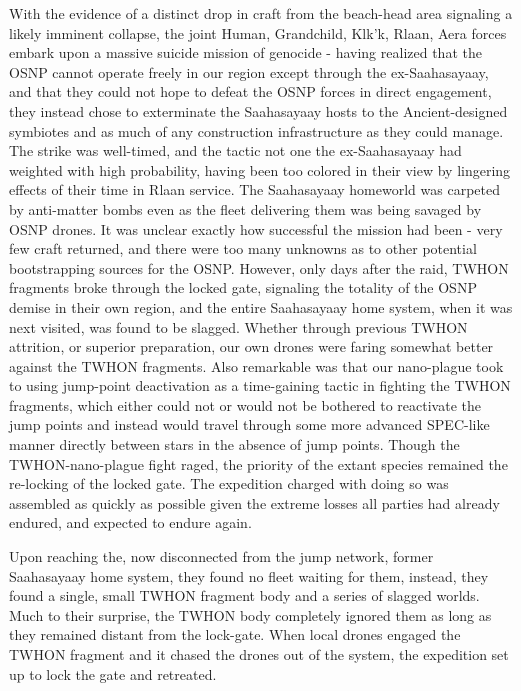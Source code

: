 With the evidence of a distinct drop in craft from the beach-head area
signaling a likely imminent collapse, the joint Human, Grandchild,
Klk'k, Rlaan, Aera forces embark upon a massive suicide mission of
genocide - having realized that the OSNP cannot operate freely in our
region except through the ex-Saahasayaay, and that they could not hope
to defeat the OSNP forces in direct engagement, they instead chose to
exterminate the Saahasayaay hosts to the Ancient-designed symbiotes
and as much of any construction infrastructure as they could
manage. The strike was well-timed, and the tactic not one the
ex-Saahasayaay had weighted with high probability, having been too
colored in their view by lingering effects of their time in Rlaan
service. The Saahasayaay homeworld was carpeted by anti-matter bombs
even as the fleet delivering them was being savaged by OSNP drones. It
was unclear exactly how successful the mission had been - very few
craft returned, and there were too many unknowns as to other potential
bootstrapping sources for the OSNP. However, only days after the raid,
TWHON fragments broke through the locked gate, signaling the totality
of the OSNP demise in their own region, and the entire Saahasayaay
home system, when it was next visited, was found to be
slagged. Whether through previous TWHON attrition, or superior
preparation, our own drones were faring somewhat better against the
TWHON fragments. Also remarkable was that our nano-plague took to
using jump-point deactivation as a time-gaining tactic in fighting the
TWHON fragments, which either could not or would not be bothered to
reactivate the jump points and instead would travel through some more
advanced SPEC-like manner directly between stars in the absence of
jump points. Though the TWHON-nano-plague fight raged, the priority of
the extant species remained the re-locking of the locked gate. The
expedition charged with doing so was assembled as quickly as possible
given the extreme losses all parties had already endured, and expected
to endure again.

Upon reaching the, now disconnected from the jump network, former
Saahasayaay home system, they found no fleet waiting for them,
instead, they found a single, small TWHON fragment body and a series
of slagged worlds. Much to their surprise, the TWHON body completely
ignored them as long as they remained distant from the lock-gate. When
local drones engaged the TWHON fragment and it chased the drones out
of the system, the expedition set up to lock the gate and retreated.

